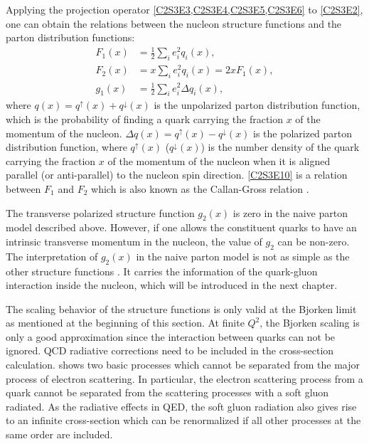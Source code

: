 Applying the projection operator \cref{C2S3E3,C2S3E4,C2S3E5,C2S3E6} to \cref{C2S3E2}, one can obtain the relations between the nucleon structure functions and the parton distribution functions:
\begin{align} \label{C2S3E9}
F_1(x) & = \frac{1}{2}\sum_ie_i^2q_i(x), \\ \label{C2S3E10}
F_2(x) & = x\sum_ie_i^2q_i(x) = 2xF_1(x), \\ \label{C2S3E11}
g_1(x) & = \frac{1}{2}\sum_ie_i^2\Delta q_i(x),
\end{align}
where $q(x)=q^\uparrow(x)+q^\downarrow(x)$ is the unpolarized parton distribution function, which is the probability of finding a quark carrying the fraction $x$ of the momentum of the nucleon. $\Delta q(x)=q^\uparrow(x)-q^\downarrow(x)$ is the polarized parton distribution function, where $q^\uparrow(x)$ ($q^\downarrow(x)$) is the number density of the quark carrying the fraction $x$ of the momentum of the nucleon when it is aligned parallel (or anti-parallel) to the nucleon spin direction. \cref{C2S3E10} is a relation between $F_1$ and $F_2$ which is also known as the Callan-Gross relation \cite{Callan1969}.

The transverse polarized structure function $g_2(x)$ is zero in the naive parton model described above. However, if one allows the constituent quarks to have an intrinsic transverse momentum in the nucleon, the value of $g_2$ can be non-zero.
The interpretation of $g_2(x)$ in the naive parton model is not as simple as the other structure functions \cite{Thomas2001}. It carries the information of the quark-gluon interaction inside the nucleon, which will be introduced in the next chapter.

The scaling behavior of the structure functions is only valid at the Bjorken limit as mentioned at the beginning of this section. At finite $Q^2$, the Bjorken scaling is only a good approximation since the interaction between quarks can not be ignored. QCD radiative corrections need to be included in the cross-section calculation.  shows two basic processes which cannot be separated from the major process of electron scattering. In particular, the electron scattering process from a quark cannot be separated from the scattering processes with a soft gluon radiated. As the radiative effects in QED, the soft gluon radiation also gives rise to an infinite cross-section which can be renormalized if all other processes at the same order are included.

